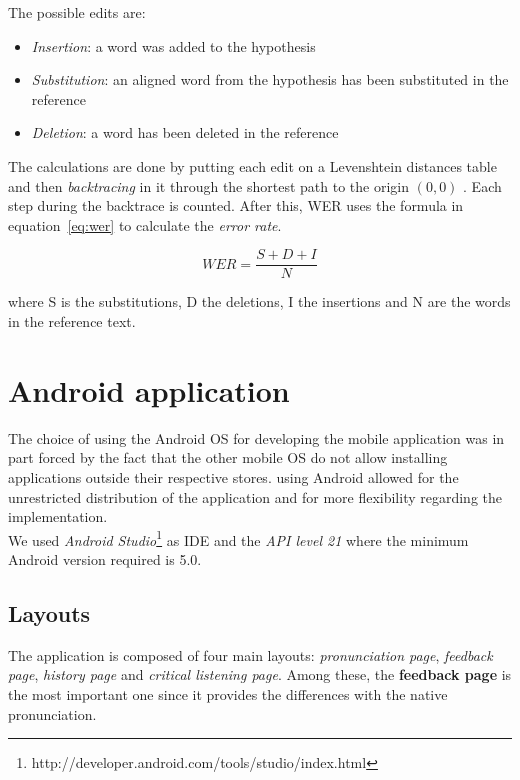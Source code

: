 \noindent The possible edits are:

\begin{itemize}
	\item \textit{Insertion}: a word was added to the hypothesis
	\item \textit{Substitution}: an aligned word from the hypothesis has been substituted in the reference
	\item \textit{Deletion}: a word has been deleted in the reference
\end{itemize}

\noindent The calculations are done by putting each edit on a Levenshtein distances table and then \textit{backtracing} in it through the shortest path to the origin $(0, 0)$ \cite{WER}. Each step during the backtrace is counted. After this, WER uses the formula in equation~\ref{eq:wer} to calculate the \textit{error rate}.

\begin{equation}
\label{eq:wer}
	WER = \frac{S + D + I}{N}
\end{equation}

\noindent where S is the substitutions, D the deletions, I the insertions and N are the words in the reference text.




\section{Android application}
\label{sec:android_app}
\noindent The choice of using the Android OS for developing the mobile application was in part forced by the fact that the other mobile OS do not allow installing applications outside their respective stores. using Android allowed for the unrestricted distribution of the application and for more flexibility regarding the implementation. \\
\noindent We used \textit{Android Studio}\footnote{http://developer.android.com/tools/studio/index.html} as IDE and the \textit{API level 21} where the minimum  Android version required is 5.0.

\subsection{Layouts}
\label{ssec:layouts}
The application is composed of four main layouts: \textit{pronunciation page}, \textit{feedback page}, \textit{history page} and \textit{critical listening page}. Among these, the \textbf{feedback page} is the most important one since it provides the differences with the native pronunciation. \\

